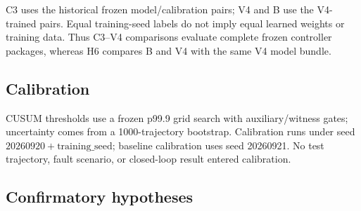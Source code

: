 \documentclass[conference]{IEEEtran}
\begin{document}
C3 uses the historical frozen model/calibration pairs; V4 and B use the
V4-trained pairs. Equal training-seed labels do not imply equal learned
weights or training data. Thus C3--V4 comparisons evaluate complete frozen
controller packages, whereas H6 compares B and V4 with the same V4 model
bundle.

\subsection{Calibration}
\label{sec:calibration}

CUSUM thresholds use a frozen p99.9 grid search with auxiliary/witness
gates; uncertainty comes from a 1000-trajectory bootstrap. Calibration runs
under seed $20260920+\text{training\_seed}$; baseline calibration uses seed
20260921. No test trajectory, fault scenario, or closed-loop result entered
calibration.

\subsection{Confirmatory hypotheses}
\label{sec:hypotheses}
\end{document}
